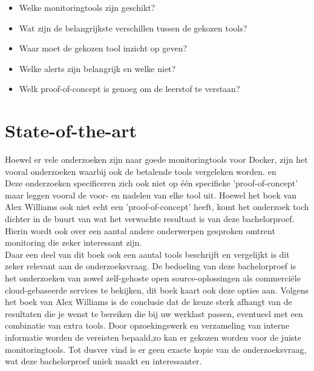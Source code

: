 \begin{itemize}
    \item Welke monitoringtools zijn geschikt?
    \item Wat zijn de belangrijkste verschillen tussen de gekozen tools?
    \item Waar moet de gekozen tool inzicht op geven?
    \item Welke alerts zijn belangrijk en welke niet?
    \item Welk proof-of-concept is genoeg om de leerstof te verstaan?
\end{itemize}


\section{State-of-the-art}
\label{sec:state-of-the-art}
Hoewel er vele onderzoeken zijn naar goede monitoringtools voor Docker, zijn het vooral onderzoeken waarbij ook de betalende tools vergeleken worden.\autocite{Ribenzaft2020} en \autocite{Cirelly2020}\\ 
Deze onderzoeken specificeren zich ook niet op één specifieke 'proof-of-concept' maar leggen vooral de voor- en nadelen van elke tool uit.
Hoewel het boek van Alex Williams \autocite{Cole2016} ook niet echt een 'proof-of-concept' heeft, komt het onderzoek toch dichter in de buurt van wat het verwachte resultaat is van deze bachelorproef. Hierin wordt ook over een aantal andere onderwerpen gesproken omtrent monitoring die zeker interessant zijn. 
\\
Daar een deel van dit boek ook een aantal tools beschrijft en vergelijkt is dit zeker relevant aan de onderzoeksvraag. De bedoeling van deze bachelorproef is het onderzoeken van zowel zelf-gehoste open source-oplossingen als commerciële cloud-gebaseerde services te bekijken, dit boek kaart ook deze opties aan. Volgens het boek van Alex Williams\autocite{Cole2016} is de conclusie dat de keuze sterk afhangt van de resultaten die je wenst te bereiken die bij uw werklast passen, eventueel met een combinatie van extra tools. Door opzoekingswerk en verzameling van interne informatie worden de vereisten bepaald,zo kan er gekozen worden voor de juiste monitoringtools. Tot dusver vind is er geen exacte kopie van de onderzoeksvraag, wat deze bachelorproef uniek maakt en interessanter.\\


